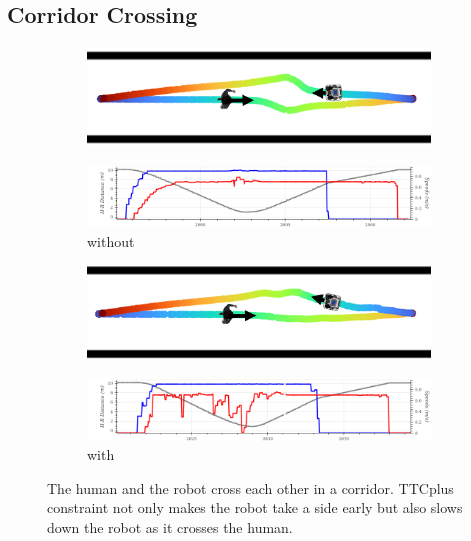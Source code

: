 \subsection{Corridor Crossing}
\begin{figure}[H]
\centering
\begin{subfigure}{0.5\columnwidth}
  \includegraphics[width=\textwidth]{images/appendix/ttc/corridor/without.png}
\end{subfigure}
\vspace{0.5cm}
\begin{subfigure}{0.8\columnwidth}
  \includegraphics[width=\textwidth]{images/appendix/ttc/corridor/coor_without2.png}
  \caption{without}
\end{subfigure}

\begin{subfigure}{0.5\columnwidth}
  \includegraphics[width=\textwidth]{images/appendix/ttc/corridor/with.png}
\end{subfigure}
\begin{subfigure}{0.8\columnwidth}
  \includegraphics[width=\textwidth]{images/appendix/ttc/corridor/coor_with2.png}
  \caption{with}
\end{subfigure}
\caption{The human and the robot cross each other in a corridor. TTCplus constraint not only makes the robot take a side early but also slows down the robot as it crosses the human.}
\label{fig:corridor_ttc}
\end{figure} 

